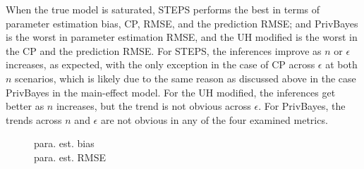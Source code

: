 \documentclass[12pt, A4]{article}
\theoremstyle{plain}
\theoremstyle{exampstyle}\newtheorem{defn}{Definition}
\theoremstyle{exampstyle}\newtheorem{lem}{Lemma}
\theoremstyle{exampstyle}\newtheorem{cor}{Corollary}
\theoremstyle{exampstyle}\newtheorem{pro}{Proposition}
\theoremstyle{exampstyle}\newtheorem{cla}{Claim}
\theoremstyle{exampstyle}\newtheorem{rem}{Remark}
\begin{document}
When the true model is saturated, STEPS performs the best in terms of parameter estimation bias, CP, RMSE, and the prediction RMSE; and PrivBayes is the worst in parameter estimation RMSE, and the UH modified is the worst in the CP and the prediction RMSE. For STEPS, the inferences improve as $n$ or $\epsilon$ increases, as expected, with the only exception in the case of CP across $\epsilon$ at both $n$ scenarios, which is likely due to the same reason as discussed above in the case PrivBayes in the main-effect model. For the UH modified, the inferences get better as $n$ increases, but the trend is not obvious across $\epsilon$. For PrivBayes, the trends across $n$ and $\epsilon$ are not obvious in any of the four examined metrics.  
\begin{figure}[!htb]
\small{para. est. bias$\;\quad$}
\\
\small{para. est. RMSE}
\\

\end{figure}
\end{document}
